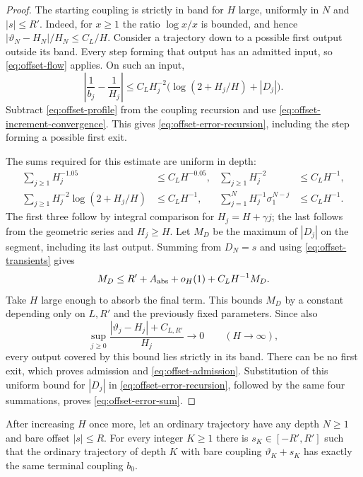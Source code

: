 \begin{proof}
The starting coupling is strictly in band for $H$ large, uniformly
in $N$ and $|s|\le R'$.  Indeed, for $x\ge1$ the ratio
$\log x/x$ is bounded, and hence
$|\vartheta_N-H_N|/H_N\le C_L/H$.
Consider a trajectory down to a possible first output outside its
band.  Every step forming that output has an admitted input, so
\eqref{eq:offset-flow} applies.  On such an input,
\[
 \left|\frac1{b_j}-\frac1{H_j}\right|
 \le C_LH_j^{-2}
          \bigl(\log(2+H_j/H)+|D_j|\bigr).
\]
Subtract \eqref{eq:offset-profile} from the coupling recursion and
use \eqref{eq:offset-increment-convergence}.  This gives
\eqref{eq:offset-error-recursion}, including the step forming a
possible first exit.

The sums required for this estimate are uniform in depth:
\begin{align*}
 \sum_{j\ge1}H_j^{-1.05}&\le C_LH^{-0.05},&
 \sum_{j\ge1}H_j^{-2}&\le C_LH^{-1},\\
 \sum_{j\ge1}H_j^{-2}\log(2+H_j/H)&\le C_LH^{-1},&
 \sum_{j=1}^{N}H_j^{-1}\sigma_1^{N-j}&\le C_LH^{-1}.
\end{align*}
The first three follow by integral comparison for
$H_j=H+\gamma j$; the last follows from the geometric series and
$H_j\ge H$.  Let $M_D$ be the maximum of $|D_j|$ on the segment,
including its last output.  Summing from $D_N=s$ and using
\eqref{eq:offset-transients} gives
\[
 M_D\le R'+A_{\rm abs}+o_H(1)+C_LH^{-1}M_D.
\]
Take $H$ large enough to absorb the final term.  This bounds $M_D$
by a constant depending only on $L,R'$ and the previously fixed
parameters.  Since also
\[
 \sup_{j\ge0}\frac{|\vartheta_j-H_j|+C_{L,R'}}{H_j}
       \longrightarrow0\qquad(H\longrightarrow\infty),
\]
every output covered by this bound lies strictly in its band.
There can be no first exit, which proves admission and
\eqref{eq:offset-admission}.  Substitution of this uniform bound
for $|D_j|$ in \eqref{eq:offset-error-recursion}, followed by the
same four summations, proves \eqref{eq:offset-error-sum}.
\end{proof}

\begin{lemma}
\label{lem:retuning}
After increasing $H$ once more, let an ordinary trajectory have any
depth $N\ge1$ and bare offset $|s|\le R$.  For every integer $K\ge1$
there is $s_K\in[-R',R']$ such that the ordinary trajectory of
depth $K$ with bare coupling $\vartheta_K+s_K$ has exactly the
same terminal coupling $b_0$.
\end{lemma}

